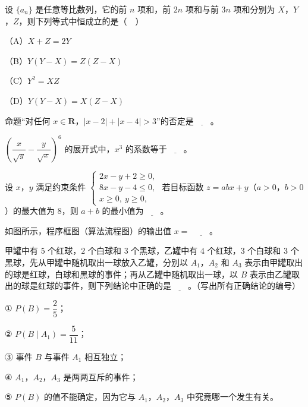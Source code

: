 \begin{question}
设 $\{a_n\}$ 是任意等比数列，它的前 $n$ 项和，前 $2n$ 项和与前 $3n$ 项和分别为 $X$，$Y$，$Z$，则下列等式中恒成立的是（　）

（A）$X+Z=2Y$

（B）$Y(Y-X)=Z(Z-X)$

（C）$Y^2=XZ$

（D）$Y(Y-X)=X(Z-X)$

\end{question}

\begin{question}
命题“对任何 $x\in\mathbf R$，$|x-2|+|x-4|>3$”的否定是$\underline{\qquad}$。

\end{question}
\begin{question}
$\left(\dfrac{x}{\sqrt y}-\dfrac{y}{\sqrt x}\right)^6$ 的展开式中，$x^3$ 的系数等于$\underline{\qquad}$。

\end{question}
\begin{question}
设 $x$，$y$ 满足约束条件 $\begin{cases}2x-y+2\geqslant0,\\ 8x-y-4\leqslant0,\\ x\geqslant0,\ y\geqslant0,\end{cases}$ 若目标函数 $z=abx+y$（$a>0$，$b>0$）的最大值为 $8$，则 $a+b$ 的最小值为$\underline{\qquad}$。

\Needspace{0.4\textheight}
\end{question}
\begingroup
\renewenvironment{question}{\Needspace{0.5\textheight}}{}
\begin{question}
如图所示，程序框图（算法流程图）的输出值 $x=$ $\underline{\qquad}$。
\nopagebreak[4]
\begin{center}\end{center}
\nopagebreak[4]
\end{question}
\endgroup
\begin{question}
甲罐中有 $5$ 个红球，$2$ 个白球和 $3$ 个黑球，乙罐中有 $4$ 个红球，$3$ 个白球和 $3$ 个黑球，先从甲罐中随机取出一球放入乙罐，分别以 $A_1$，$A_2$ 和 $A_3$ 表示由甲罐取出的球是红球，白球和黑球的事件；再从乙罐中随机取出一球，以 $B$ 表示由乙罐取出的球是红球的事件，则下列结论中正确的是$\underline{\qquad}$。（写出所有正确结论的编号）

① $P(B)=\dfrac25$；

② $P(B\mid A_1)=\dfrac5{11}$；

③ 事件 $B$ 与事件 $A_1$ 相互独立；

④ $A_1$，$A_2$，$A_3$ 是两两互斥的事件；

⑤ $P(B)$ 的值不能确定，因为它与 $A_1$，$A_2$，$A_3$ 中究竟哪一个发生有关。

\end{question}

